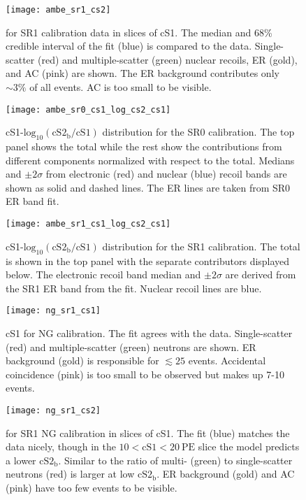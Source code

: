 \begin{figure}
\centering
\texttt{[image: ambe\_sr1\_cs2]}
\caption{\cstwob for SR1 \ambe calibration data in slices of cS1.  The median and 68\% credible interval of the fit (blue) is compared
to the data.  Single-scatter (red) and multiple-scatter (green) nuclear recoils, ER (gold), and AC (pink) are shown.  The ER background
contributes only ${\sim}3\%$ of all events.  AC is too small to be visible.}
\label{fig:er_nr_calibrations_results_ambe_sr1_cs2}
\end{figure}

\begin{figure}
\centering
\texttt{[image: ambe\_sr0\_cs1\_log\_cs2\_cs1]}
\caption{cS1-$\mathrm{log}_{10}(\mathrm{cS2_b / cS1})$ distribution for the SR0 \ambe calibration.  The top panel shows the
total while the rest show the contributions from different components normalized with respect to the total.  Medians and $\pm 2\sigma$
from electronic (red) and nuclear (blue) recoil bands are shown as solid and dashed lines.  The ER lines are taken from SR0 ER band fit.}
\label{fig:er_nr_calibrations_results_ambe_sr0_cs1_log_cs2_cs1}
\end{figure}

\begin{figure}
\centering
\texttt{[image: ambe\_sr1\_cs1\_log\_cs2\_cs1]}
\caption{cS1-$\mathrm{log}_{10}(\mathrm{cS2_b / cS1})$ distribution for the SR1 \ambe calibration.  The total is shown
in the top panel with the separate contributors displayed below.  The electronic recoil band median and $\pm 2\sigma$ are derived
from the SR1 ER band from the fit.  Nuclear recoil lines are blue.}
\label{fig:er_nr_calibrations_results_ambe_sr1_cs1_log_cs2_cs1}
\end{figure}

\begin{figure}
\centering
\texttt{[image: ng\_sr1\_cs1]}
\caption{cS1 for NG calibration.  The fit agrees with the data.  Single-scatter (red) and multiple-scatter (green) neutrons are shown.  ER
background (gold) is responsible for $\lesssim 25$ events.  Accidental coincidence (pink) is too small to be observed but makes up
7-10 events.}
\label{fig:er_nr_calibrations_results_ng_sr1_cs1}
\end{figure}

\begin{figure}
\centering
\texttt{[image: ng\_sr1\_cs2]}
\caption{\cstwob for SR1 NG calibration in slices of cS1.  The fit (blue) matches the data nicely, though in the
$10 < \mathrm{cS1} < 20\ \mathrm{PE}$ slice the model predicts a lower $\mathrm{cS2_b}$.  Similar to \ambe the ratio of multi-
(green) to single-scatter neutrons (red) is larger at low $\mathrm{cS2_b}$.  ER background (gold) and AC (pink) have too few events
to be visible.}
\label{fig:er_nr_calibrations_results_ng_sr1_cs2}
\end{figure}

